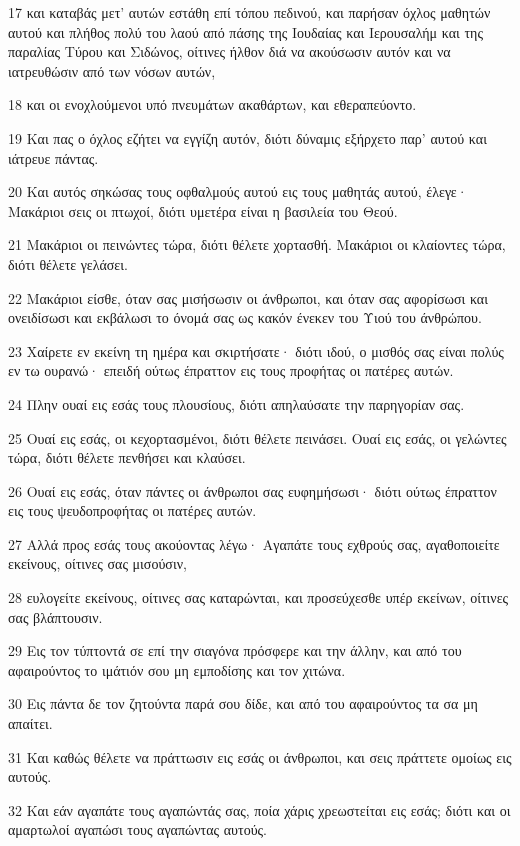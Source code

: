 \par 17 και καταβάς μετ' αυτών εστάθη επί τόπου πεδινού, και παρήσαν όχλος μαθητών αυτού και πλήθος πολύ του λαού από πάσης της Ιουδαίας και Ιερουσαλήμ και της παραλίας Τύρου και Σιδώνος, οίτινες ήλθον διά να ακούσωσιν αυτόν και να ιατρευθώσιν από των νόσων αυτών,
\par 18 και οι ενοχλούμενοι υπό πνευμάτων ακαθάρτων, και εθεραπεύοντο.
\par 19 Και πας ο όχλος εζήτει να εγγίζη αυτόν, διότι δύναμις εξήρχετο παρ' αυτού και ιάτρευε πάντας.
\par 20 Και αυτός σηκώσας τους οφθαλμούς αυτού εις τους μαθητάς αυτού, έλεγε· Μακάριοι σεις οι πτωχοί, διότι υμετέρα είναι η βασιλεία του Θεού.
\par 21 Μακάριοι οι πεινώντες τώρα, διότι θέλετε χορτασθή. Μακάριοι οι κλαίοντες τώρα, διότι θέλετε γελάσει.
\par 22 Μακάριοι είσθε, όταν σας μισήσωσιν οι άνθρωποι, και όταν σας αφορίσωσι και ονειδίσωσι και εκβάλωσι το όνομά σας ως κακόν ένεκεν του Υιού του άνθρώπου.
\par 23 Χαίρετε εν εκείνη τη ημέρα και σκιρτήσατε· διότι ιδού, ο μισθός σας είναι πολύς εν τω ουρανώ· επειδή ούτως έπραττον εις τους προφήτας οι πατέρες αυτών.
\par 24 Πλην ουαί εις εσάς τους πλουσίους, διότι απηλαύσατε την παρηγορίαν σας.
\par 25 Ουαί εις εσάς, οι κεχορτασμένοι, διότι θέλετε πεινάσει. Ουαί εις εσάς, οι γελώντες τώρα, διότι θέλετε πενθήσει και κλαύσει.
\par 26 Ουαί εις εσάς, όταν πάντες οι άνθρωποι σας ευφημήσωσι· διότι ούτως έπραττον εις τους ψευδοπροφήτας οι πατέρες αυτών.
\par 27 Αλλά προς εσάς τους ακούοντας λέγω· Αγαπάτε τους εχθρούς σας, αγαθοποιείτε εκείνους, οίτινες σας μισούσιν,
\par 28 ευλογείτε εκείνους, οίτινες σας καταρώνται, και προσεύχεσθε υπέρ εκείνων, οίτινες σας βλάπτουσιν.
\par 29 Εις τον τύπτοντά σε επί την σιαγόνα πρόσφερε και την άλλην, και από του αφαιρούντος το ιμάτιόν σου μη εμποδίσης και τον χιτώνα.
\par 30 Εις πάντα δε τον ζητούντα παρά σου δίδε, και από του αφαιρούντος τα σα μη απαίτει.
\par 31 Και καθώς θέλετε να πράττωσιν εις εσάς οι άνθρωποι, και σεις πράττετε ομοίως εις αυτούς.
\par 32 Και εάν αγαπάτε τους αγαπώντάς σας, ποία χάρις χρεωστείται εις εσάς; διότι και οι αμαρτωλοί αγαπώσι τους αγαπώντας αυτούς.
